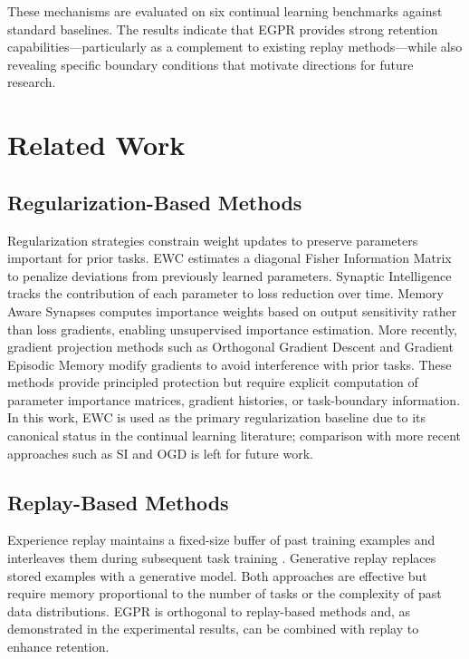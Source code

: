 \documentclass[11pt,a4paper]{article}
\begin{document}
These mechanisms are evaluated on six continual learning benchmarks against standard baselines. The results indicate that EGPR provides strong retention capabilities---particularly as a complement to existing replay methods---while also revealing specific boundary conditions that motivate directions for future research.

\section{Related Work}

\subsection{Regularization-Based Methods}

Regularization strategies constrain weight updates to preserve parameters important for prior tasks. EWC \citep{kirkpatrick2017overcoming} estimates a diagonal Fisher Information Matrix to penalize deviations from previously learned parameters. Synaptic Intelligence \citep[SI;][]{zenke2017continual} tracks the contribution of each parameter to loss reduction over time. Memory Aware Synapses \citep[MAS;][]{aljundi2018memory} computes importance weights based on output sensitivity rather than loss gradients, enabling unsupervised importance estimation. More recently, gradient projection methods such as Orthogonal Gradient Descent \citep[OGD;][]{farajtabar2020orthogonal} and Gradient Episodic Memory \citep[GEM;][]{lopezpaz2017gradient} modify gradients to avoid interference with prior tasks. These methods provide principled protection but require explicit computation of parameter importance matrices, gradient histories, or task-boundary information. In this work, EWC is used as the primary regularization baseline due to its canonical status in the continual learning literature; comparison with more recent approaches such as SI and OGD is left for future work.

\subsection{Replay-Based Methods}

Experience replay maintains a fixed-size buffer of past training examples and interleaves them during subsequent task training \citep{chaudhry2019efficient}. Generative replay \citep{shin2017continual} replaces stored examples with a generative model. Both approaches are effective but require memory proportional to the number of tasks or the complexity of past data distributions. EGPR is orthogonal to replay-based methods and, as demonstrated in the experimental results, can be combined with replay to enhance retention.
\end{document}
